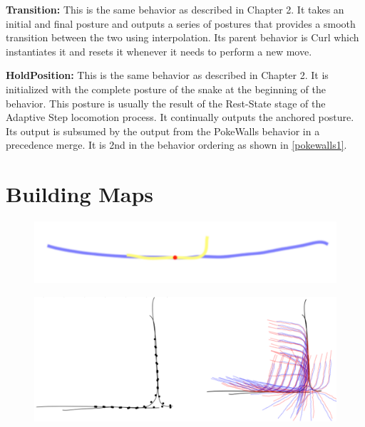 \textbf{Transition:} This is the same behavior as described in Chapter 2. It takes an initial and final posture and outputs a series of postures that provides a smooth transition between the two using interpolation. Its parent behavior is Curl which instantiates it and resets it whenever it needs to perform a new move.

\textbf{HoldPosition:} This is the same behavior as described in Chapter 2. It is initialized with the complete posture of the snake at the beginning of the behavior. This posture is usually the result of the Rest-State stage of the Adaptive Step locomotion process. It continually outputs the anchored posture. Its output is subsumed by the output from the PokeWalls behavior in a precedence merge. It is 2nd in the behavior ordering as shown in \autoref{pokewalls1}. 

\pagebreak 

\chapter{Building Maps}
\label{buildingmaps}

\begin{figure}[htbp]
\centering
\includegraphics[keepaspectratio,width=\textwidth,height=0.75\textheight]{PastedGraphic7.pdf}
\label{pastedgraphic7.pdf}
\end{figure}


\begin{figure}[htbp]
\centering
\includegraphics[keepaspectratio,width=\textwidth,height=0.75\textheight]{PastedGraphic8.pdf}
\label{pastedgraphic8.pdf}
\end{figure}



